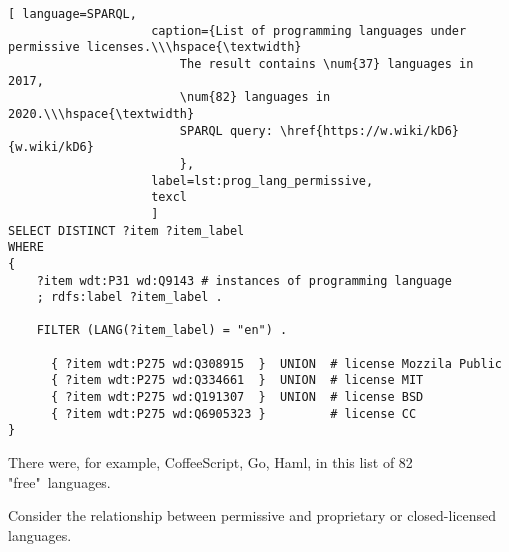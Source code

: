 \begin{lstlisting}[ language=SPARQL, 
                    caption={List of programming languages under permissive licenses.\\\hspace{\textwidth}
                        The result contains \num{37} languages in 2017, 
                        \num{82} languages in 2020.\\\hspace{\textwidth}
                        SPARQL query: \href{https://w.wiki/kD6}{w.wiki/kD6}
                        },
                    label=lst:prog_lang_permissive,
                    texcl 
                    ]
SELECT DISTINCT ?item ?item_label
WHERE
{
    ?item wdt:P31 wd:Q9143 # instances of programming language
    ; rdfs:label ?item_label . 

    FILTER (LANG(?item_label) = "en") . 
  
      { ?item wdt:P275 wd:Q308915  }  UNION  # license Mozzila Public
      { ?item wdt:P275 wd:Q334661  }  UNION  # license MIT
      { ?item wdt:P275 wd:Q191307  }  UNION  # license BSD
      { ?item wdt:P275 wd:Q6905323 }         # license CC
}
\end{lstlisting}%

There were, for example, CoffeeScript, Go, Haml, in this list of 82 "free"\  languages.

Consider the relationship between permissive and proprietary or closed-licensed languages.

